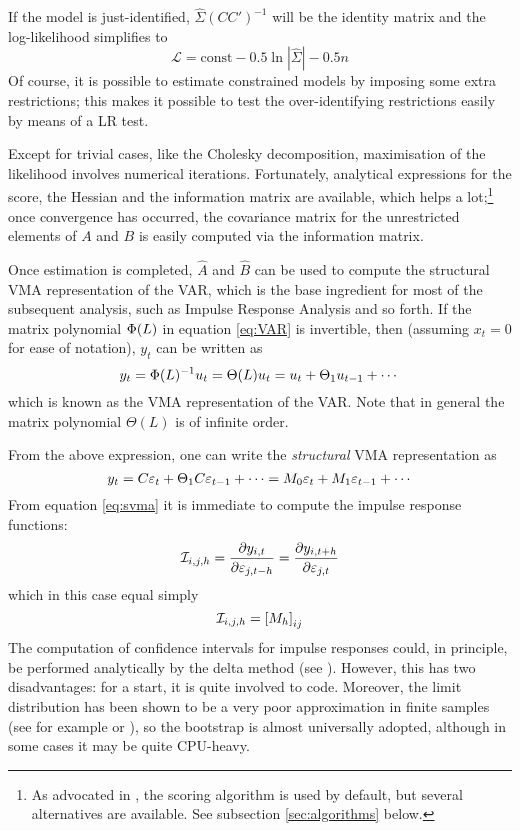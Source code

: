\documentclass[a4paper,10pt]{article}
\newcommand{\PrE}[1]{\ensuremath u_{#1}} %
\newcommand{\StS}[1]{\ensuremath \varepsilon_{#1}} %
\newcommand{\VarSym}{\ensuremath \Phi}
\newcommand{\IRF}[1]{\ensuremath \mathcal{I}_{#1}}
\newcommand{\pder}[2]{\ensuremath\frac{\partial #1}{\partial #2}}
\begin{document}
If the model is just-identified, $\hat{\Sigma} (CC')^{-1}$ will be the
identity matrix and the log-likelihood simplifies to
\[
  \mathcal{L} = \mathrm{const} - 0.5 \ln |\hat{\Sigma}| - 0.5 n
\]
Of course, it is possible to estimate constrained models by imposing
some extra restrictions; this makes it possible to test the
over-identifying restrictions easily by means of a LR test.

Except for trivial cases, like the Cholesky decomposition,
maximisation of the likelihood involves numerical
iterations. Fortunately, analytical expressions for the score, the
Hessian and the information matrix are available, which helps a
lot;\footnote{As advocated in \citeauthor{AG}, the scoring algorithm
  is used by default, but several alternatives are available. See
  subsection \ref{sec:algorithms} below.} once convergence has
occurred, the covariance matrix for the unrestricted elements of $A$
and $B$ is easily computed via the information matrix.

Once estimation is completed, $\hat{A}$ and $\hat{B}$ can be used to
compute the structural VMA representation of the VAR, which is the
base ingredient for most of the subsequent analysis, such as Impulse
Response Analysis and so forth. If the matrix polynomial $\VarSym(L)$ in
equation \eqref{eq:VAR} is invertible, then (assuming $x_t=0$ for ease of
notation), $y_t$ can be written as
\begin{equation}
  \label{eq:vma}
y_t = \VarSym(L)^{-1}\PrE{t} = \Theta(L) \PrE{t} = \PrE{t} + \Theta_1
\PrE{t-1} + \cdots
\end{equation}
which is known as the VMA representation of the VAR. Note that in
general the matrix polynomial $\Theta(L)$ is of infinite order.

From the above expression, one can write the \emph{structural} VMA
representation as
\begin{equation}
  \label{eq:svma}
  y_t = C \StS{t} + \Theta_1 C \StS{t-1}  + \cdots 
      = M_0 \StS{t} + M_1 \StS{t-1}  + \cdots 
\end{equation}
From equation \eqref{eq:svma} it is immediate to compute the impulse response
functions:
\begin{equation}
  \label{eq:IRFdef}
  \IRF{i,j,h} = \pder{y_{i,t}}{\StS{j, t-h}} = \pder{y_{i,t+h}}{\StS{j, t}} 
\end{equation}
which in this case equal simply
\[
  \IRF{i,j,h} = \left[ M_h \right]_{ij}
\]
The computation of confidence intervals for impulse responses could,
in principle, be performed analytically by the delta method (see
\cite{Lut90}). However, this has two disadvantages: for a start, it is
quite involved to code. Moreover, the limit distribution has been
shown to be a very poor approximation in finite samples (see for
example \cite{FaBra96} or \cite{Kilian98}), so the bootstrap is almost
universally adopted, although in some cases it may be quite CPU-heavy.
\end{document}
